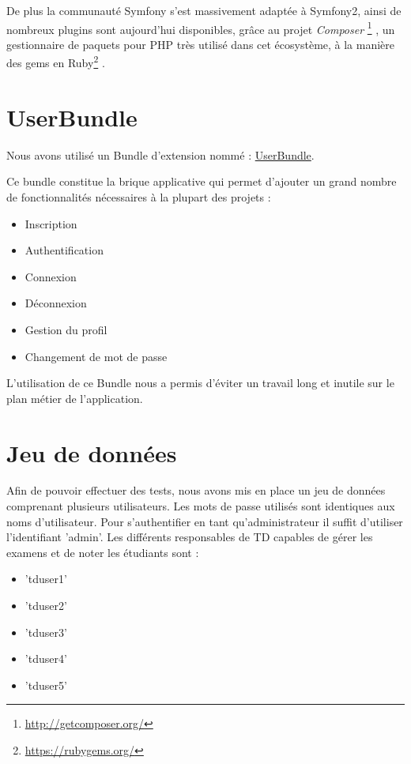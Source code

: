 \documentclass{report}
\begin{document}
      De plus la communauté Symfony s'est massivement adaptée à Symfony2, ainsi
      de nombreux plugins sont aujourd'hui disponibles, grâce au projet \textsl{Composer}
      \footnote{\href{http://getcomposer.org/}{http://getcomposer.org/}}
      , un gestionnaire de paquets pour PHP très utilisé dans cet écosystème,
      à la manière des gems en Ruby\footnote{\href{https://rubygems.org/}{https://rubygems.org/}}
.
      

    \section{UserBundle}
      Nous avons utilisé un Bundle d'extension nommé : 
      \href{https://github.com/FriendsOfSymfony/FOSUserBundle}{UserBundle}.
      
      Ce bundle constitue la brique applicative qui permet d'ajouter un grand
      nombre de fonctionnalités nécessaires à la plupart des projets :
      \begin{itemize}
        \item{Inscription}
        \item{Authentification}
        \item{Connexion}
        \item{Déconnexion}
        \item{Gestion du profil}
        \item{Changement de mot de passe}
      \end{itemize}\vspace{1em}

      L'utilisation de ce Bundle nous a permis d'éviter un travail long
      et inutile sur le plan métier de l'application.
      
    \section{Jeu de données}
        Afin de pouvoir effectuer des tests, nous avons mis en place un jeu de
        données comprenant plusieurs utilisateurs. Les mots de passe utilisés
        sont identiques aux noms d'utilisateur.
        Pour s'authentifier en tant qu'administrateur il suffit d'utiliser
        l'identifiant 'admin'.
        Les différents responsables de TD capables de gérer les examens et de
        noter les étudiants sont :
        
        \begin{itemize}
          \item{'tduser1'}
          \item{'tduser2'}
          \item{'tduser3'}
          \item{'tduser4'}
          \item{'tduser5'}
        \end{itemize}
        
\end{document}
